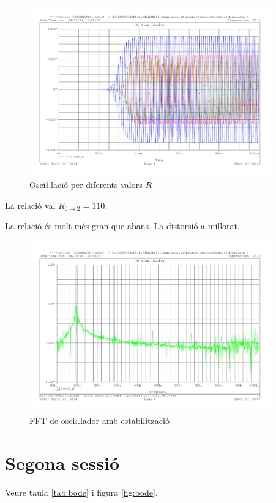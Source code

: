 \documentclass[catalan, a4paper, nobib]{tufte-handout}
\begin{document}
\begin{figure}[!h]
    \begin{center}
        \includegraphics[width=395px]{5.5.pdf}
    \end{center}
    \caption{Osci\l.lació per diferents valors $R$}
    \label{fig:variable_r}
\end{figure}

 La relació val $R_{0\rightarrow2}=\num{110}$.

 La relació és molt més gran que abans. La distorsió a millorat.

\begin{figure}[!h]
    \begin{center}
        \includegraphics[width=395px]{5.6.pdf}
    \end{center}
    \caption{FFT de osci\l.lador amb estabilització}
\end{figure}

\newpage

\part{Segona sessió}
 Veure taula \ref{tab:bode} i figura \ref{fig:bode}.
\end{document}
